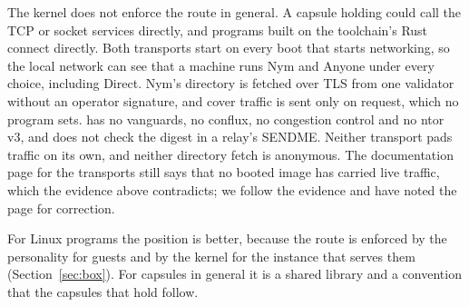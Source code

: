 The kernel does not enforce the route in general. A capsule holding  could call the TCP or socket services directly, and programs built on the toolchain's Rust  connect directly. Both transports start on every boot that starts networking, so the local network can see that a machine runs Nym and Anyone under every choice, including Direct. Nym's directory is fetched over TLS from one validator without an operator signature, and cover traffic is sent only on request, which no program sets.  has no vanguards, no conflux, no congestion control and no ntor v3, and does not check the digest in a relay's SENDME. Neither transport pads traffic on its own, and neither directory fetch is anonymous. The documentation page for the transports still says that no booted image has carried live traffic, which the evidence above contradicts; we follow the evidence and have noted the page for correction.

For Linux programs the position is better, because the route is enforced by the personality for guests and by the kernel for the instance that serves them (Section~\ref{sec:box}). For capsules in general it is a shared library and a convention that the capsules that hold  follow.

